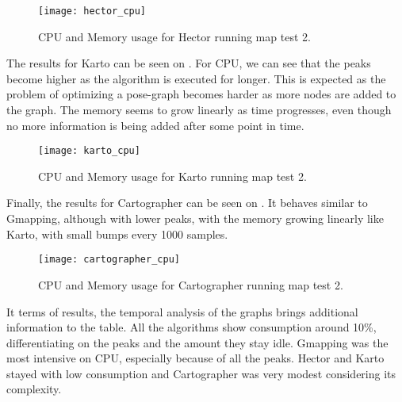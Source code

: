 \begin{figure}[!ht]
    \centering
    \texttt{[image: hector\_cpu]}
    \caption{CPU and Memory usage for Hector running map test 2.}
    \label{fig:hector_cpu}
\end{figure}

The results for Karto can be seen on . For CPU, we can see that the peaks become higher as the algorithm is executed for longer. This is expected as the problem of optimizing a pose-graph becomes harder as more nodes are added to the graph. The memory seems to grow linearly as time progresses, even though no more information is being added after some point in time.

\begin{figure}[!ht]
    \centering
    \texttt{[image: karto\_cpu]}
    \caption{CPU and Memory usage for Karto running map test 2.}
    \label{fig:karto_cpu}
\end{figure}

Finally, the results for Cartographer can be seen on . It behaves similar to Gmapping, although with lower peaks, with the memory growing linearly like Karto, with small bumps every 1000 samples.

\begin{figure}[!ht]
    \centering
    \texttt{[image: cartographer\_cpu]}
    \caption{CPU and Memory usage for Cartographer running map test 2.}
    \label{fig:cartographer_cpu}
\end{figure}

It terms of results, the temporal analysis of the graphs brings additional information to the table. All the algorithms show consumption around 10\%, differentiating on the peaks and the amount they stay idle. Gmapping was the most intensive on CPU, especially because of all the peaks. Hector and Karto stayed with low consumption and Cartographer was very modest considering its complexity. 